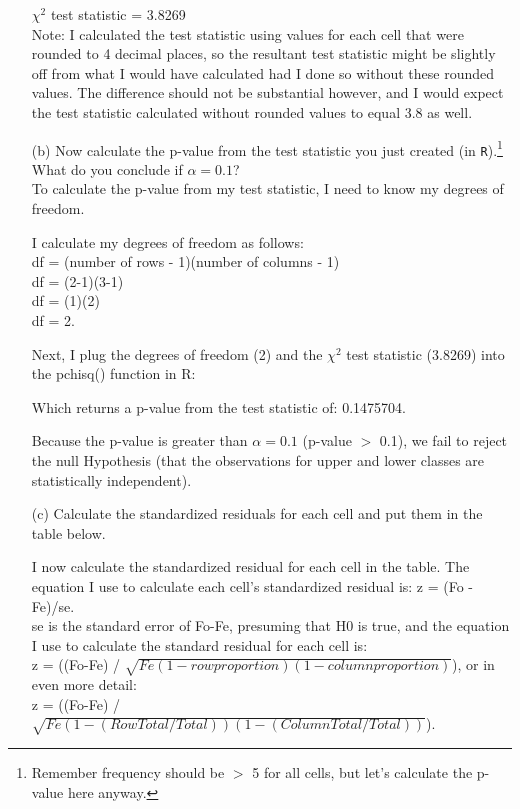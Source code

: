 \documentclass[12pt,letterpaper]{article}
\begin{document}
\begin{enumerate}
	$\chi^2$ test statistic = 3.8269\\
	
	Note: I calculated the test statistic using values for each cell that were rounded to 4 decimal places, so the resultant test statistic might be slightly off from what I would have calculated had I done so without these rounded values. The difference should not be substantial however, and I would expect the test statistic calculated without rounded values to equal 3.8 as well.
	
	\item [(b)]
	Now calculate the p-value from the test statistic you just created (in \texttt{R}).\footnote{Remember frequency should be $>$ 5 for all cells, but let's calculate the p-value here anyway.}  What do you conclude if $\alpha = 0.1$?\\
	
	To calculate the p-value from my test statistic, I need to know my degrees of freedom.  
	
	I calculate my degrees of freedom as follows:\\
	df = (number of rows - 1)(number of columns - 1) \\
	df = (2-1)(3-1) \\
	df = (1)(2) \\
	df = 2.
	
	Next, I plug the degrees of freedom (2) and the $\chi^2$ test statistic (3.8269) into the pchisq() function in R:
	
	 
	
	Which returns a p-value from the test statistic of: 0.1475704.
	
	Because the p-value is greater than $\alpha = 0.1$ (p-value $>$ 0.1), we fail to reject the null Hypothesis (that the observations for upper and lower classes are statistically independent).
	
	\newpage
	\item [(c)] Calculate the standardized residuals for each cell and put them in the table below.
	\vspace{1cm}
	
	I now calculate the standardized residual for each cell in the table. The equation I use to calculate each cell's standardized residual is: z = (Fo - Fe)/se.\\
	se is the standard error of Fo-Fe, presuming that H0 is true, and the equation I use to calculate the standard residual for each cell is: \\
	z = ((Fo-Fe) / $\sqrt{Fe(1-row proportion)(1-column proportion)}$), or in even more detail:\\
	 z = ((Fo-Fe) / $\sqrt{Fe(1-(RowTotal/Total))
		(1-(ColumnTotal/Total))}$).  \\
	

\end{enumerate}
\end{document}
